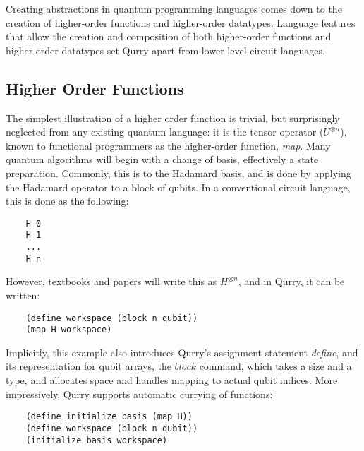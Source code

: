 \documentclass[a4paper,twocolumn,11pt,accepted=2017-05-09]{quantumarticle}
\begin{document}
    Creating abstractions in quantum programming languages comes down to the creation of higher-order functions and higher-order datatypes.
    Language features that allow the creation and composition of both higher-order functions and higher-order datatypes set Qurry apart from lower-level circuit languages.

    \subsection{Higher Order Functions}

    The simplest illustration of a higher order function is trivial, but surprisingly neglected from any existing quantum language: it is the tensor operator ($U^{\otimes n}$), known to functional programmers as the higher-order function, \emph{map}.
    Many quantum algorithms will begin with a change of basis, effectively a state preparation. 
    Commonly, this is to the Hadamard basis, and is done by applying the Hadamard operator to a block of qubits.
    In a conventional circuit language, this is done as the following:
    \begin{verbatim}
    H 0
    H 1
    ...
    H n\end{verbatim}
    However, textbooks and papers will write this as $H^{\otimes n}$, and in Qurry, it can be written:
    \begin{verbatim}
    (define workspace (block n qubit))
    (map H workspace)\end{verbatim}
    Implicitly, this example also introduces Qurry's assignment statement \emph{define}, and its representation for qubit arrays, the $block$ command, which takes a size and a type, and allocates space and handles mapping to actual qubit indices.
    More impressively, Qurry supports automatic currying of functions:
    \begin{verbatim}
    (define initialize_basis (map H))
    (define workspace (block n qubit))
    (initialize_basis workspace)\end{verbatim}
\end{document}
